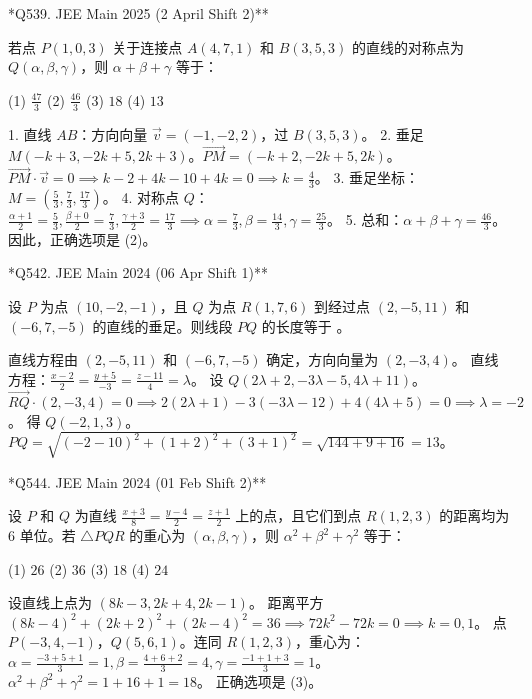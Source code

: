 \begin{questions}
\question **Q539. JEE Main 2025 (2 April Shift 2)**

若点 $P(1, 0, 3)$ 关于连接点 $A(4, 7, 1)$ 和 $B(3, 5, 3)$ 的直线的对称点为 $Q(\alpha, \beta, \gamma)$，则 $\alpha + \beta + \gamma$ 等于：

(1) $\frac{47}{3}$ \quad (2) $\frac{46}{3}$ \quad (3) $18$ \quad (4) $13$

\begin{solution}
1. 直线 $AB$：方向向量 $\vec{v} = (-1, -2, 2)$，过 $B(3, 5, 3)$。
2. 垂足 $M(-k+3, -2k+5, 2k+3)$。$\vec{PM} = (-k+2, -2k+5, 2k)$。
$\vec{PM} \cdot \vec{v} = 0 \implies k-2 + 4k-10 + 4k = 0 \implies k = \frac{4}{3}$。
3. 垂足坐标：$M = (\frac{5}{3}, \frac{7}{3}, \frac{17}{3})$。
4. 对称点 $Q$：$\frac{\alpha+1}{2} = \frac{5}{3}, \frac{\beta+0}{2} = \frac{7}{3}, \frac{\gamma+3}{2} = \frac{17}{3} \implies \alpha = \frac{7}{3}, \beta = \frac{14}{3}, \gamma = \frac{25}{3}$。
5. 总和：$\alpha + \beta + \gamma = \frac{46}{3}$。
因此，正确选项是 (2)。
\end{solution}

\question **Q542. JEE Main 2024 (06 Apr Shift 1)**

设 $P$ 为点 $(10, -2, -1)$，且 $Q$ 为点 $R(1, 7, 6)$ 到经过点 $(2, -5, 11)$ 和 $(-6, 7, -5)$ 的直线的垂足。则线段 $PQ$ 的长度等于 \underline{\hspace{1cm}}。

\begin{solution}
直线方程由 $(2, -5, 11)$ 和 $(-6, 7, -5)$ 确定，方向向量为 $(2, -3, 4)$。
直线方程：$\frac{x-2}{2} = \frac{y+5}{-3} = \frac{z-11}{4} = \lambda$。
设 $Q(2\lambda+2, -3\lambda-5, 4\lambda+11)$。
$\vec{RQ} \cdot (2, -3, 4) = 0 \implies 2(2\lambda+1) - 3(-3\lambda-12) + 4(4\lambda+5) = 0 \implies \lambda = -2$。
得 $Q(-2, 1, 3)$。
$PQ = \sqrt{(-2-10)^2 + (1+2)^2 + (3+1)^2} = \sqrt{144+9+16} = 13$。
\end{solution}

\question **Q544. JEE Main 2024 (01 Feb Shift 2)**

设 $P$ 和 $Q$ 为直线 $\frac{x+3}{8} = \frac{y-4}{2} = \frac{z+1}{2}$ 上的点，且它们到点 $R(1, 2, 3)$ 的距离均为 $6$ 单位。若 $\triangle PQR$ 的重心为 $(\alpha, \beta, \gamma)$，则 $\alpha^2 + \beta^2 + \gamma^2$ 等于：

(1) $26$ \quad (2) $36$ \quad (3) $18$ \quad (4) $24$

\begin{solution}
设直线上点为 $(8k-3, 2k+4, 2k-1)$。
距离平方 $(8k-4)^2 + (2k+2)^2 + (2k-4)^2 = 36 \implies 72k^2 - 72k = 0 \implies k=0, 1$。
点 $P(-3, 4, -1)$，$Q(5, 6, 1)$。连同 $R(1, 2, 3)$，重心为：
$\alpha = \frac{-3+5+1}{3} = 1, \beta = \frac{4+6+2}{3} = 4, \gamma = \frac{-1+1+3}{3} = 1$。
$\alpha^2 + \beta^2 + \gamma^2 = 1 + 16 + 1 = 18$。
正确选项是 (3)。
\end{solution}


\end{questions}
